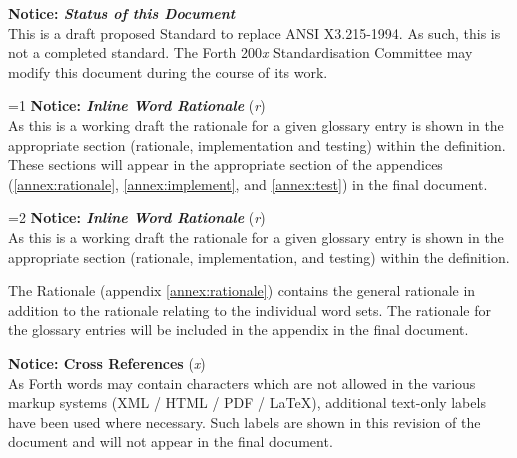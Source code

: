 \begin{titlepage}
\ifrelease\else
\textbf{Notice: \emph{Status of this Document}} \\
This is a draft proposed Standard to replace ANSI X3.215-1994.
As such, this is not a completed standard. The Forth 200\emph{x}
Standardisation Committee may modify this document during
the course of its work.
\fi

%
%

\ifnum\value{part}=1
	\ifinline
\textbf{Notice: \emph{Inline Word Rationale}} (\textit{r}) \\
As this is a working draft the rationale for a given glossary
entry is shown in the appropriate section (rationale,
implementation and testing) within the definition.
These sections will appear in the appropriate section of
the appendices (\ref{annex:rationale}, \ref{annex:implement},
and \ref{annex:test}) in the final document.
	\fi
\fi


%
%

\ifnum\value{part}=2
	\ifinline
\textbf{Notice: \emph{Inline Word Rationale}} (\textit{r}) \\
As this is a working draft the rationale for a given glossary
entry is shown in the appropriate section (rationale,
implementation, and testing) within the definition.

The Rationale (appendix \ref{annex:rationale}) contains the
general rationale in addition to the rationale relating to
the individual word sets.
The rationale for the glossary entries will be included in
the appendix in the final document.
	\fi
\fi


\ifshowref
\textbf{Notice: Cross References} (\textit{x}) \\
As Forth words may contain characters which are not allowed in the
various markup systems (XML / HTML / PDF / \LaTeX), additional
text-only labels have been used where necessary. Such labels are
shown in this revision of the document and will not appear in the
final document.
\fi
\end{titlepage}

